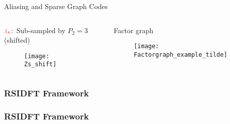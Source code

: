 \begin{frame}{Aliasing and Sparse Graph Codes}
{\begin{columns}
		\begin{block}{{\small$\color{red}z_s$:\ Sub-sampled by $P_2=3$ (shifted)}}
			\begin{figure}[t]
				\centering
				\texttt{[image: Zs\_shift]}
			\end{figure}
		\end{block}
		
		\begin{block}{\small Factor graph}
			\begin{figure}[t]
				\centering
				\texttt{[image: Factorgraph\_example\_tilde]}
			\end{figure}
		\end{block}
	\end{columns}}
		
	\end{frame}

\begin{frame}\frametitle{RSIDFT Framework}
	
		\begin{figure}[t!]
			\begin{center}
				\resizebox{0.8\textwidth}{!}{}
			\end{center}	   
			\label{fig:rsidft}
			\vspace{5 pt}
		\end{figure}
\end{frame}


\begin{frame}\frametitle{RSIDFT Framework}
	\begin{columns}
\begin{figure}[t!]
	\begin{center}
		\resizebox{1.05\textwidth}{0.7\textheight}{}
		\end{center}	   
		\label{fig:rsidft}
		\vspace{5 pt}
		\end{figure}
		\begin{figure}[h!]
			\begin{center}
				\resizebox{1.0\textwidth}{0.65\textheight}{}	
			\end{center}	   
			\vspace{5 pt}
		\end{figure}
		
	\end{columns}
	
\end{frame}

